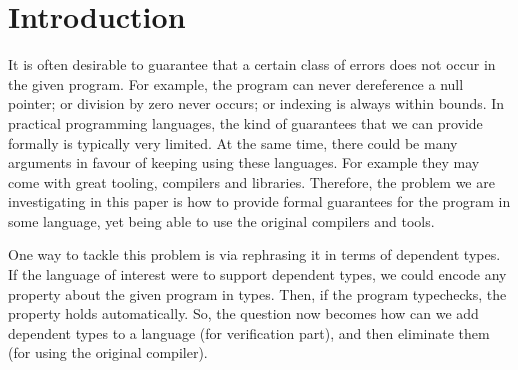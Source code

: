 \documentclass[sigplan,anonymous,review]{acmart}
\begin{document}
\begin{abstract}
%
\end{abstract}
\maketitle

\section{Introduction}



It is often desirable to guarantee that a certain class of errors does
not occur in the given program.  For example, the program can never dereference
a null pointer; or division by zero never occurs; or indexing is always
within bounds.  In practical programming languages, the kind of guarantees
that we can provide formally is typically very limited.  At the same time,
there could be many arguments in favour of keeping using these languages.
For example they may come with great tooling, compilers and libraries.
Therefore, the problem we are investigating in this paper is how to
provide formal guarantees for the program in some language, yet being
able to use the original compilers and tools.

One way to tackle this problem is via rephrasing it in terms
of dependent types.  If the language of interest were to support dependent
types, we could encode any property about the given program in
types.  Then, if the program typechecks, the property holds automatically.
So, the question now becomes how can we add dependent types to a language
(for verification part), and then eliminate them (for using the original
compiler).
\end{document}
